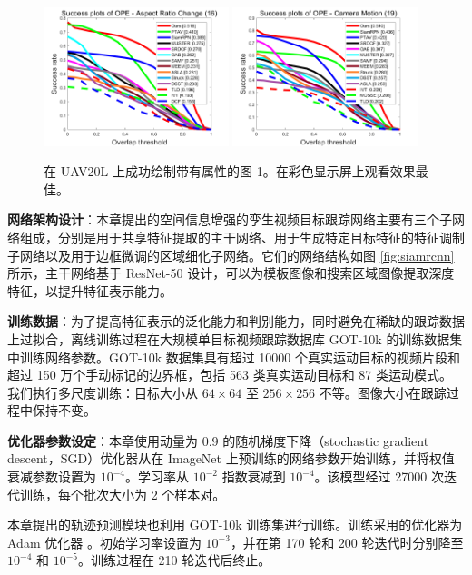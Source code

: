 \begin{figure}[t!]
\begin{center}
	\includegraphics[width=0.48\textwidth]{Img/globally/UAV20L/ARC_overlap_OPE_AUC.png}
	\includegraphics[width=0.48\textwidth]{Img/globally/UAV20L/CM_overlap_OPE_AUC.png}
\end{center}
   \caption{在 UAV20L 上成功绘制带有属性的图 1。在彩色显示屏上观看效果最佳。}
\label{fig:globally_uav20l_1}
\end{figure}

\textbf{网络架构设计}：本章提出的空间信息增强的孪生视频目标跟踪网络主要有三个子网络组成，分别是用于共享特征提取的主干网络、用于生成特定目标特征的特征调制子网络以及用于边框微调的区域细化子网络。它们的网络结构如图 \ref{fig:siamrcnn} 所示，主干网络基于 ResNet-50 设计，可以为模板图像和搜索区域图像提取深度特征，以提升特征表示能力。

\textbf{训练数据}：为了提高特征表示的泛化能力和判别能力，同时避免在稀缺的跟踪数据上过拟合，离线训练过程在大规模单目标视频跟踪数据库 GOT-10k \cite{GOT-10k} 的训练数据集中训练网络参数。GOT-10k 数据集具有超过 10000 个真实运动目标的视频片段和超过 150 万个手动标记的边界框，包括 563 类真实运动目标和 87 类运动模式。
我们执行多尺度训练：目标大小从 $64 \times 64$ 至 $256 \times 256$ 不等。图像大小在跟踪过程中保持不变。

\textbf{优化器参数设定}：本章使用动量为 0.9 的随机梯度下降（stochastic gradient descent，SGD）优化器从在 ImageNet 上预训练的网络参数开始训练，并将权值衰减参数设置为 $10^{-4}$。学习率从 $10^{-2}$ 指数衰减到 $10^{-4}$。该模型经过 27000 次迭代训练，每个批次大小为 2 个样本对。

本章提出的轨迹预测模块也利用 GOT-10k 训练集进行训练。训练采用的优化器为 Adam 优化器 \cite{kingma2014adam}。初始学习率设置为 $10^{-3}$，并在第 170 轮和 200 轮迭代时分别降至 $10^{-4}$ 和 $10^{-5}$。训练过程在 210 轮迭代后终止。

